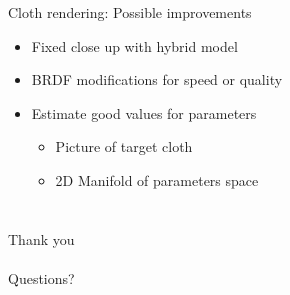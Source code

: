 \documentclass{beamer}
\begin{document}
\begin{frame}{Cloth rendering: Possible improvements}
\begin{itemize}
\setlength\itemsep{0.5em}
\item Fixed close up with hybrid model
\item BRDF modifications for speed or quality
\item Estimate good values for parameters
	\begin{itemize}
	\item Picture of target cloth
	\item 2D Manifold of parameters space 
	\end{itemize}		
\end{itemize}
\end{frame}

\section*{}

\begin{frame}[plain,c]
\begin{center}
\huge Thank you
\\~\\
\Large Questions?
\end{center}
\end{frame}
\end{document}
